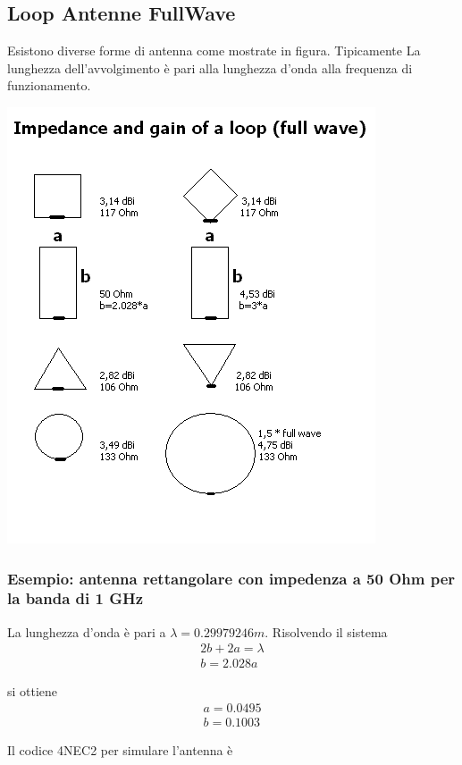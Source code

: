\documentclass[10pt,a4paper]{book}
\begin{document}
\subsection{Loop Antenne FullWave}
Esistono diverse forme di antenna come mostrate in figura. Tipicamente La lunghezza dell'avvolgimento è pari alla lunghezza d'onda alla frequenza di funzionamento.
\begin{center}
\includegraphics[scale=1]{img/Antenne/Loop_and_quad.png} 
\end{center}

\subsubsection{Esempio: antenna rettangolare con impedenza a 50 Ohm per la banda di 1 GHz}
La lunghezza d'onda è pari a $\lambda = 0.29979246 m$. Risolvendo il sistema
\begin{eqnarray}
2 b + 2 a = \lambda \\
b = 2.028 a
\end{eqnarray}

si ottiene 
\begin{eqnarray}
a= 0.0495 \\
b= 0.1003
\end{eqnarray}

Il codice 4NEC2 per simulare l'antenna è 

\end{document}
